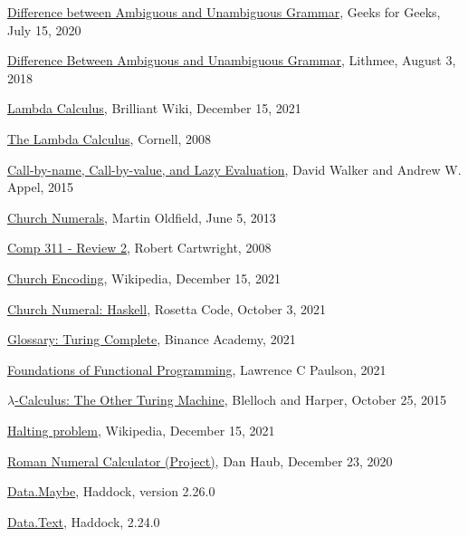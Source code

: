 \documentclass{article}
\begin{document}
\begin{thebibliography}{99}
 \href{https://www.geeksforgeeks.org/difference-between-ambiguous-and-unambiguous-grammar/}{Difference between Ambiguous and Unambiguous Grammar}, Geeks for Geeks, July 15, 2020

 \href{https://pediaa.com/difference-between-ambiguous-and-unambiguous-grammar/}{Difference Between Ambiguous and Unambiguous Grammar}, Lithmee, August 3, 2018

 \href{https://brilliant.org/wiki/lambda-calculus/}{Lambda Calculus}, Brilliant Wiki, December 15, 2021

 \href{https://www.cs.cornell.edu/courses/cs3110/2008fa/recitations/rec26.html}{The Lambda Calculus}, Cornell, 2008

 \href{https://www.cs.princeton.edu/courses/archive/fall16/cos326/lec/17-cbn-cbv.pdf}{Call-by-name, Call-by-value, and Lazy Evaluation}, David Walker and Andrew W. Appel, 2015

 \href{https://mjoldfield.com/atelier/2011/01/church-numerals.html}{Church Numerals}, Martin Oldfield, June 5, 2013

 \href{https://www.cs.rice.edu/~javaplt/311/Readings/supplemental.pdf}{Comp 311 - Review 2}, Robert Cartwright, 2008

 \href{https://en.wikipedia.org/wiki/Church_encoding}{Church Encoding}, Wikipedia, December 15, 2021

 \href{https://rosettacode.org/wiki/Church_numerals#Haskell}{Church Numeral: Haskell}, Rosetta Code, October 3, 2021

 \href{https://academy.binance.com/en/glossary/turing-complete}{Glossary: Turing Complete}, Binance Academy, 2021

 \href{https://www.cl.cam.ac.uk/~lp15/papers/Notes/Founds-FP.pdf}{Foundations of Functional Programming}, Lawrence C Paulson, 2021

 \href{https://www.cs.cmu.edu/~rwh/talks/cs50talk.pdf}{$\lambda$-Calculus: The Other Turing Machine}, Blelloch and Harper, October 25, 2015

 \href{https://en.wikipedia.org/wiki/Halting_problem}{Halting problem}, Wikipedia, December 15, 2021

 \href{https://danshaub.github.io/HaskellBlog/BlogPosts/post4.html}{Roman Numeral Calculator (Project)}, Dan Haub, December 23, 2020

 \href{https://hackage.haskell.org/package/base-4.16.0.0/docs/Data-Maybe.html}{Data.Maybe}, Haddock, version 2.26.0

 \href{https://hackage.haskell.org/package/text-1.2.5.0/docs/Data-Text.html#g:6}{Data.Text}, Haddock, 2.24.0

\end{thebibliography}
\end{document}
